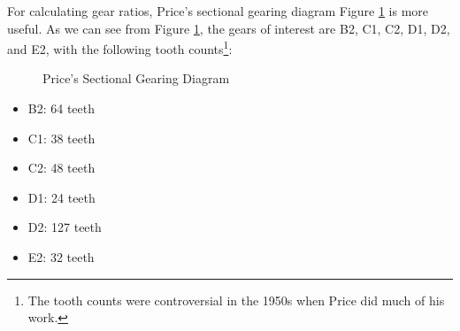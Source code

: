 \documentclass[11pt, oneside]{article}   	%
\theoremstyle{definition}
\begin{document}
\bigskip
\noindent
For calculating gear ratios,  Price's sectional gearing diagram Figure \ref{fig:sectional_gearing} is more useful. As we can see from Figure \ref{fig:sectional_gearing}, the gears of interest
are B2, C1, C2, D1, D2, and E2, with the following tooth counts\footnote{The tooth counts were controversial in the 1950s when Price did much of his work.}:


\bigskip
\newpage
\begin{figure}[H]
\caption{Price's Sectional Gearing Diagram \cite{gears_from_the_greeks}}
\label{fig:sectional_gearing}
\end{figure}
\bigskip
\bigskip
\bigskip
\begin{minipage}[c]{0.45\textwidth}
  \begin{itemize}
    \item B2: 64 teeth
    \item C1: 38 teeth
    \item C2: 48 teeth
    \item D1: 24 teeth
    \item D2: 127 teeth
    \item E2: 32 teeth
  \end{itemize}
\end{minipage}
\end{document}
